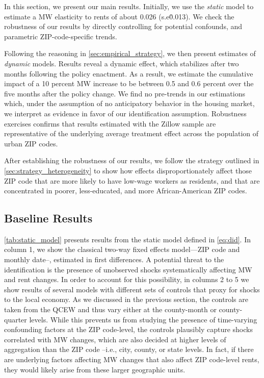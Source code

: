 
In this section, we present our main results. Initially, we use the \textit{static} model
to estimate a MW elasticity to rents of about 0.026 (s.e\. 0.013). We check the 
robustness of our results by directly controlling for potential confounds, and parametric 
ZIP-code-specific trends.

Following the reasoning in \autoref{sec:empirical_strategy}, we then present estimates of 
\textit{dynamic} models. Results reveal a dynamic effect, which stabilizes after two
months following the policy enactment. As a result, we estimate the cumulative impact of 
a 10 percent MW increase to be between 0.5 and 0.6 percent over the five months after the 
policy change.
We find no pre-trends in our estimations which, under the assumption of no anticipatory 
behavior in the housing market, we interpret as evidence in favor of our identification
assumption. Robustness exercises confirms that results estimated with the Zillow sample 
are representative of the underlying average treatment effect across the population of 
urban ZIP codes.

After establishing the robustness of our results, we follow the strategy outlined in 
\autoref{sec:strategy_heterogeneity} to show how effects disproportionately affect those 
ZIP code that are more likely to have low-wage workers as residents, and that are 
concentrated in poorer, less-educated, and more African-American ZIP codes. 

\subsection{Baseline Results}\label{sec:baseline_results}

\autoref{tab:static_model} presents results from the static model defined in \autoref{eq:did}. 
In column 1, we show the classical two-way fixed effects model---ZIP code and monthly date--, 
estimated in first differences. A potential threat to the identification is the presence of 
unobserved shocks systematically affecting MW and rent changes. In order to account for this 
possibility, in columns 2 to 5 we show results of several models with different sets of 
controls that proxy for shocks to the local economy. As we discussed in the previous section, 
the controls are taken from the QCEW and thus vary either at the county-month or 
county-quarter levels. While this prevents us from studying the presence of time-varying 
confounding factors at the ZIP code-level, the controls plausibly capture shocks correlated 
with MW changes, which are also decided at higher levels of aggregation than the ZIP code 
--i.e., city, county, or state levels. In fact, if there are underlying factors affecting MW 
changes that also affect ZIP code-level rents, they would likely arise from these larger 
geographic units. 


